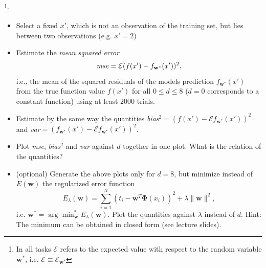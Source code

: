 \documentclass[a4]{article}
\begin{document}
\vspace{2mm}
\footnote{In all tasks $\mathcal{E}$ refers to the expected value with respect to the random variable ${\mathbf w^*}$, i.e. $\mathcal{E} \equiv \mathcal{E}_{\mathbf w^*}$}:
\begin{itemize}
\item Select a fixed $x'$, which is not an observation of the training set, but lies between two observations (e.g. $x' = 2$)
\item Estimate the \emph{mean squared error} 
\begin{equation} \nonumber
\mbox{\emph{mse}} = \mathcal{E} (f(x')-f_{\mathbf w^*}(x'))^2,
\end{equation}i.e., the mean of the squared residuals of the models prediction $f_{\mathbf w^*}(x')$ from the true function value $f(x')$ for all $0 \leq d \leq 8$ ($d = 0$ corresponds to a constant function) using at least 2000 trials.  
\item Estimate by the same way the quantities \emph{bias}$^2 = (f(x')-\mathcal{E} f_{\mathbf w^*}(x'))^2$ and \emph{var}$ = (f_{\mathbf w^*}(x') - \mathcal{E} f_{\mathbf w^*}(x'))^2$.
\item Plot \emph{mse}, \emph{bias}$^2$ and \emph{var} against $d$ together in one plot. What is the relation of the quantities?
\item (optional) Generate the above plots only for $d=8$, but minimize instead of $E({\mathbf w})$ the regularized error function 
\begin{equation}
E_{\lambda}({\mathbf w}) = \sum_{i = 1}^N(t_i - {\mathbf w}^T{\mathbf \Phi}(x_i))^2 + \lambda \|{\mathbf w}\|^2,
\end{equation} 
i.e. ${\mathbf w}^* = \arg\min_{\mathbf w}^* E_{\lambda}({\mathbf w})$. Plot the quantities against $\lambda$ instead of $d$. Hint: The minimum can be obtained in closed form (see lecture slides). 
\end{itemize}
\end{document}
